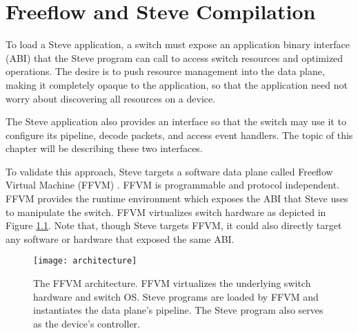 \chapter{Freeflow and Steve Compilation} \label{ch:flowpath}

To load a Steve application, a switch must expose an application binary interface (ABI) that the Steve program can call to access switch resources and optimized operations. The desire is to push resource management into the data plane, making it completely opaque to the application, so that the application need not worry about discovering all resources on a device.

The Steve application also provides an interface so that the switch may use it to configure its pipeline, decode packets, and access event handlers.
The topic of this chapter will be describing these two interfaces.

To validate this approach, Steve targets a software data plane called Freeflow Virtual Machine (FFVM) \cite{freeflow_software}. FFVM is programmable and protocol independent. FFVM provides the runtime environment which exposes the ABI that Steve uses to manipulate the switch. FFVM virtualizes switch hardware as depicted in Figure \ref{fig:architecture}. Note that, though Steve targets FFVM, it could also directly target any software or hardware that exposed the same ABI.

%
%

\begin{figure}[ht]
\centering
\texttt{[image: architecture]}
\caption{The FFVM architecture. FFVM virtualizes the underlying switch hardware and switch OS. Steve programs are loaded by FFVM and instantiates the data plane's pipeline. The Steve program also serves as the device's controller.}
\label{fig:architecture}
\end{figure}


